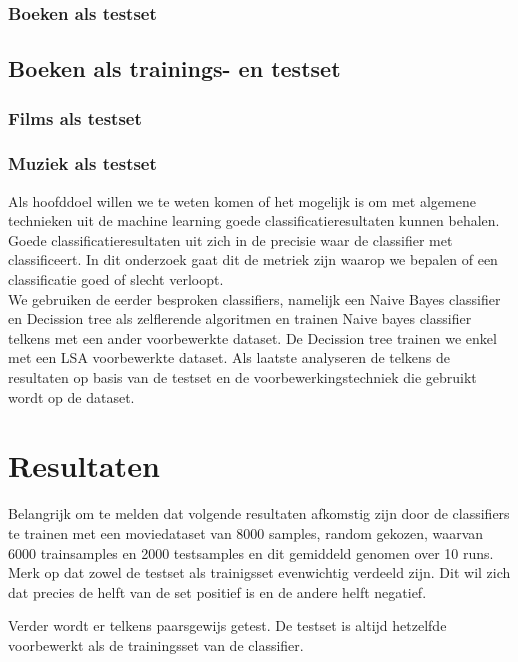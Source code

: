 \subsubsection{Boeken als testset}\label{Boeken testset}
\subsection{Boeken als trainings- en testset}\label{Boeken als trainings- en testset}
\subsubsection{Films als testset}\label{Films als testset}
\subsubsection{Muziek als testset}\label{Muziek als testset}
\label{Conclusie experiment}

Als hoofddoel willen we te weten komen of het mogelijk is om met algemene technieken uit de machine learning goede classificatieresultaten kunnen behalen. Goede classificatieresultaten uit zich in de precisie waar de classifier met classificeert. In dit onderzoek gaat dit de metriek zijn waarop we bepalen of een classificatie goed of slecht verloopt.\\
We gebruiken de eerder besproken classifiers, namelijk een Naive Bayes classifier en Decission tree als zelflerende algoritmen en trainen Naive bayes classifier telkens met een ander voorbewerkte dataset. De Decission tree trainen we enkel met een LSA voorbewerkte dataset. Als laatste analyseren de telkens de resultaten op basis van de testset en de voorbewerkingstechniek die gebruikt wordt op de dataset.

\section{Resultaten}\label{Resultaten}

Belangrijk om te melden dat volgende resultaten afkomstig zijn door de classifiers te trainen met een moviedataset van 8000 samples, random gekozen, waarvan 6000 trainsamples en 2000 testsamples en dit gemiddeld genomen over 10 runs.
Merk op dat zowel de testset als trainigsset evenwichtig verdeeld zijn.  Dit wil zich dat precies de helft van de set positief is en de andere helft negatief.

Verder wordt er telkens paarsgewijs getest. De testset is altijd hetzelfde voorbewerkt als de trainingsset van de classifier.

